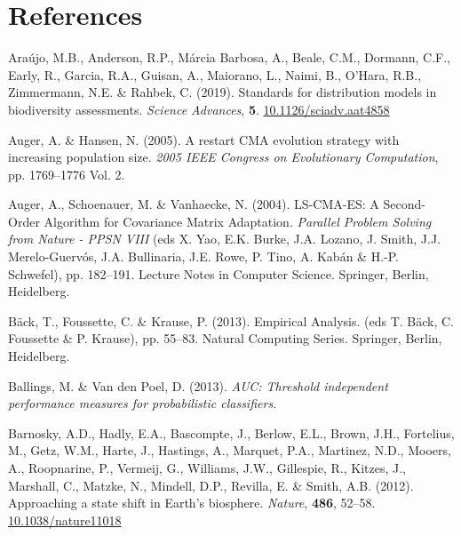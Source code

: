 \documentclass[11pt,]{article}
\newlength{\cslhangindent}
\newenvironment{CSLReferences}[2] %
 {%
  \setlength{\parindent}{0pt}
  \ifodd #1 \everypar{\setlength{\hangindent}{\cslhangindent}}\ignorespaces\fi
  \ifnum #2 > 0
  \setlength{\parskip}{#2\baselineskip}
  \fi
 }%
 {}
\begin{document}
\hypertarget{references}{%
\section{References}\label{references}}

\setlength{\parindent}{-0.2in}
\setlength{\leftskip}{0.2in}
\setlength{\parskip}{8pt}
\vspace*{-0.2in}

\noindent

\hypertarget{refs}{}
\begin{CSLReferences}{1}{0}
\leavevmode{}%
Araújo, M.B., Anderson, R.P., Márcia Barbosa, A., Beale, C.M., Dormann,
C.F., Early, R., Garcia, R.A., Guisan, A., Maiorano, L., Naimi, B.,
O'Hara, R.B., Zimmermann, N.E. \& Rahbek, C. (2019). Standards for
distribution models in biodiversity assessments. \emph{Science
Advances}, \textbf{5}.
\href{https://doi.org/10.1126/sciadv.aat4858}{10.1126/sciadv.aat4858}

\leavevmode{}%
Auger, A. \& Hansen, N. (2005). A restart {CMA} evolution strategy with
increasing population size. \emph{2005 {IEEE} {Congress} on
{Evolutionary} {Computation}}, pp. 1769--1776 Vol. 2.

\leavevmode{}%
Auger, A., Schoenauer, M. \& Vanhaecke, N. (2004). {LS}-{CMA}-{ES}: {A}
{Second}-{Order} {Algorithm} for {Covariance} {Matrix} {Adaptation}.
\emph{Parallel {Problem} {Solving} from {Nature} - {PPSN} {VIII}} (eds
X. Yao, E.K. Burke, J.A. Lozano, J. Smith, J.J. Merelo-Guervós, J.A.
Bullinaria, J.E. Rowe, P. Tino, A. Kabán \& H.-P. Schwefel), pp.
182--191. Lecture {Notes} in {Computer} {Science}. Springer, Berlin,
Heidelberg.

\leavevmode{}%
Bäck, T., Foussette, C. \& Krause, P. (2013). Empirical {Analysis}. (eds
T. Bäck, C. Foussette \& P. Krause), pp. 55--83. Natural {Computing}
{Series}. Springer, Berlin, Heidelberg.

\leavevmode{}%
Ballings, M. \& Van den Poel, D. (2013). \emph{AUC: Threshold
independent performance measures for probabilistic classifiers.}

\leavevmode{}%
Barnosky, A.D., Hadly, E.A., Bascompte, J., Berlow, E.L., Brown, J.H.,
Fortelius, M., Getz, W.M., Harte, J., Hastings, A., Marquet, P.A.,
Martinez, N.D., Mooers, A., Roopnarine, P., Vermeij, G., Williams, J.W.,
Gillespie, R., Kitzes, J., Marshall, C., Matzke, N., Mindell, D.P.,
Revilla, E. \& Smith, A.B. (2012). Approaching a state shift in
{Earth}'s biosphere. \emph{Nature}, \textbf{486}, 52--58.
\href{https://doi.org/10.1038/nature11018}{10.1038/nature11018}


\end{CSLReferences}
\end{document}
